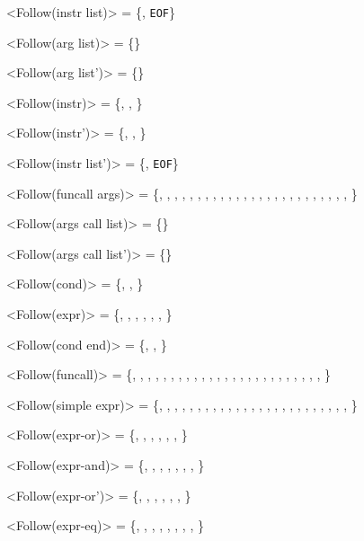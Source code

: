 <Follow(instr list)>      = \{\lit{\}}, \texttt{EOF}\}

<Follow(arg list)>        = \{\lit{)}\}

<Follow(arg list')>       = \{\lit{)}\}

<Follow(instr)>           = \{\lit{;}, \lit{,}, \lit{)}\}

<Follow(instr')>          = \{\lit{;}, \lit{,}, \lit{)}\}

<Follow(instr list')>     = \{\lit{\}}, \texttt{EOF}\}

<Follow(funcall args)>    = \{\lit{*}, \lit{/}, \lit{+}, \lit{-}, , \lit{>}, \lit{\textless}, \lit{\textless=}, \lit{>=}, , , , , \lit{==}, \lit{!=}, , , \lit{\&\&}, \lit{||}, \lit{=}, \lit{\{}, \lit{)}, \lit{;}, \lit{,}, , \}

<Follow(args call list)>  = \{\lit{)}\}

<Follow(args call list')> = \{\lit{)}\}

<Follow(cond)>            = \{\lit{;}, \lit{,}, \lit{)}\}

<Follow(expr)>            = \{\lit{\{}, \lit{)}, \lit{;}, \lit{,}, \lit{=}, , \}

<Follow(cond end)>        = \{\lit{;}, \lit{,}, \lit{)}\}

<Follow(funcall)>         = \{\lit{*}, \lit{/}, \lit{+}, \lit{-}, , \lit{>}, \lit{\textless}, \lit{\textless=}, \lit{>=}, , , , , \lit{==}, \lit{!=}, , , \lit{\&\&}, \lit{||}, \lit{=}, \lit{\{}, \lit{)}, \lit{;}, \lit{,}, , \}

<Follow(simple expr)>     = \{\lit{*}, \lit{/}, \lit{+}, \lit{-}, , \lit{>}, \lit{\textless}, \lit{\textless=}, \lit{>=}, , , , , \lit{==}, \lit{!=}, , , \lit{\&\&}, \lit{||}, \lit{=}, \lit{\{}, \lit{)}, \lit{;}, \lit{,}, , \}

<Follow(expr-or)>         = \{\lit{=}, \lit{\{}, \lit{)}, \lit{;}, \lit{,}, , \}

<Follow(expr-and)>        = \{\lit{||}, \lit{=}, \lit{\{}, \lit{)}, \lit{;}, \lit{,}, , \}

<Follow(expr-or')>        = \{\lit{=}, \lit{\{}, \lit{)}, \lit{;}, \lit{,}, , \}

<Follow(expr-eq)>         = \{\lit{\&\&}, \lit{||}, \lit{=}, \lit{\{}, \lit{)}, \lit{;}, \lit{,}, , \}

